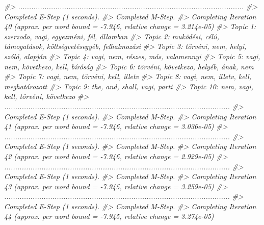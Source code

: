 \documentclass[
]{book}
\newenvironment{Shaded}{\begin{snugshade}}{\end{snugshade}}
\newcommand{\CommentTok}[1]{\textcolor[rgb]{0.56,0.35,0.01}{\textit{#1}}}
\begin{document}
\begin{Shaded}
\begin{Highlighting}[]
\CommentTok{\#\textgreater{} .......................................................................................................}
\CommentTok{\#\textgreater{} Completed E{-}Step (1 seconds). }
\CommentTok{\#\textgreater{} Completed M{-}Step. }
\CommentTok{\#\textgreater{} Completing Iteration 40 (approx. per word bound = {-}7.946, relative change = 3.214e{-}05) }
\CommentTok{\#\textgreater{} Topic 1: szerzodo, vagi, egyezméni, fél, államban }
\CommentTok{\#\textgreater{}  Topic 2: muködési, célú, támogatások, költségvetésegyéb, felhalmozási }
\CommentTok{\#\textgreater{}  Topic 3: törvéni, nem, helyi, szóló, alapján }
\CommentTok{\#\textgreater{}  Topic 4: vagi, nem, részes, más, valamennyi }
\CommentTok{\#\textgreater{}  Topic 5: vagi, nem, következo, kell, bíróság }
\CommentTok{\#\textgreater{}  Topic 6: törvéni, következo, helyéb, ának, nem }
\CommentTok{\#\textgreater{}  Topic 7: vagi, nem, törvéni, kell, illetv }
\CommentTok{\#\textgreater{}  Topic 8: vagi, nem, illetv, kell, meghatározott }
\CommentTok{\#\textgreater{}  Topic 9: the, and, shall, vagi, parti }
\CommentTok{\#\textgreater{}  Topic 10: nem, vagi, kell, törvéni, következo }
\CommentTok{\#\textgreater{} .......................................................................................................}
\CommentTok{\#\textgreater{} Completed E{-}Step (1 seconds). }
\CommentTok{\#\textgreater{} Completed M{-}Step. }
\CommentTok{\#\textgreater{} Completing Iteration 41 (approx. per word bound = {-}7.946, relative change = 3.036e{-}05) }
\CommentTok{\#\textgreater{} .......................................................................................................}
\CommentTok{\#\textgreater{} Completed E{-}Step (1 seconds). }
\CommentTok{\#\textgreater{} Completed M{-}Step. }
\CommentTok{\#\textgreater{} Completing Iteration 42 (approx. per word bound = {-}7.946, relative change = 2.929e{-}05) }
\CommentTok{\#\textgreater{} .......................................................................................................}
\CommentTok{\#\textgreater{} Completed E{-}Step (1 seconds). }
\CommentTok{\#\textgreater{} Completed M{-}Step. }
\CommentTok{\#\textgreater{} Completing Iteration 43 (approx. per word bound = {-}7.945, relative change = 3.259e{-}05) }
\CommentTok{\#\textgreater{} .......................................................................................................}
\CommentTok{\#\textgreater{} Completed E{-}Step (1 seconds). }
\CommentTok{\#\textgreater{} Completed M{-}Step. }
\CommentTok{\#\textgreater{} Completing Iteration 44 (approx. per word bound = {-}7.945, relative change = 3.274e{-}05) }

\end{Highlighting}
\end{Shaded}
\end{document}
